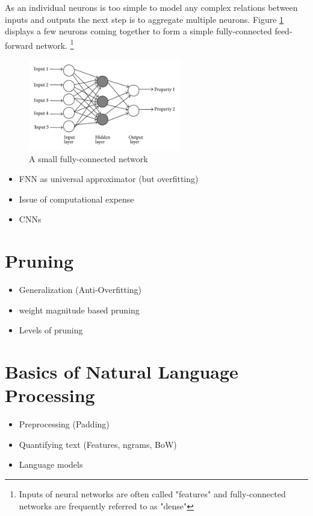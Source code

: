 As an individual neurons is too simple to model any complex relations between inputs
and outputs the next step is to aggregate multiple neurons. Figure \ref{fig:FFNetwork} displays a few neurons coming together to form a simple fully-connected feed-forward network.
\footnote{
	Inputs of neural networks are often called "features" and fully-connected networks are frequently referred to as "dense"	}
\begin{figure}
	\centering
		\includegraphics[height=150px]{gfx/Dense_FFNetwork.jpg}
		\caption{A small fully-connected network\\
			\cite{dense_network}}
		\label{fig:FFNetwork}
\end{figure}

\begin{itemize}
	\item FNN as universal approximator (but overfitting)
	\item Issue of computational expense
	\item CNNs 
\end{itemize}

\section{Pruning}
\begin{itemize}
	\item Generalization (Anti-Overfitting)
	\item weight magnitude based pruning
	\item Levels of pruning
\end{itemize}

\section{Basics of Natural Language Processing}
\begin{itemize}
	\item Preprocessing (Padding)
	\item Quantifying text (Features, ngrams, BoW)
	\item Language models
\end{itemize}